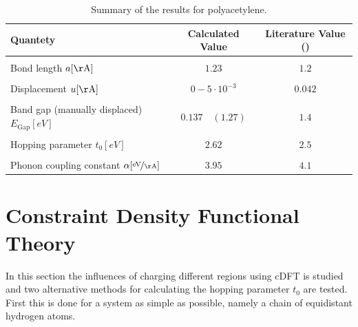 \begin{table}[]
	\centering
	\begin{tabular}{l|c|c}
	Quantety & Calculated Value & Literature Value (\cite{PhysRevLett.42.1698, doi:10.1021/cr990357p})\\
	\hline \hline
	&&\\[-.3cm]
	Bond length \hfill$a [\unit{\AA}]$ & $1.23$ & $1.2$\\ \hline&&\\[-.3cm]
	Displacement \hfill$u [\unit{\AA}]$& $0 - 5\cdot10^{-3}$ & $0.042$\\ \hline&&\\[-.3cm]
	Band gap (manually displaced)\hfill$E_\text{Gap} [\unit{eV}]$ & $0.137\quad(1.27)$ & $1.4$\\ \hline &&\\[-.3cm]
	Hopping parameter \hfill$t_0 [\unit{eV}]$ & $2.62$ & $2.5$ \\ \hline&&\\[-.3cm]
	Phonon coupling constant \hspace*{2cm}$\alpha [\unitfrac{eV}{\AA}]$& $3.95$ & $4.1$
	\end{tabular}
	\caption{Summary of the results for polyacetylene.}
	\label{table_summary_polyacetylene}
\end{table}


\section{Constraint Density Functional Theory}
\label{section_constraint_density_functonal_theory}
In this section the influences of charging different regions using cDFT is studied and two alternative methods for calculating the hopping parameter $t_0$ are tested. First this is done for a system as simple as possible, namely a chain of equidistant hydrogen atoms.
